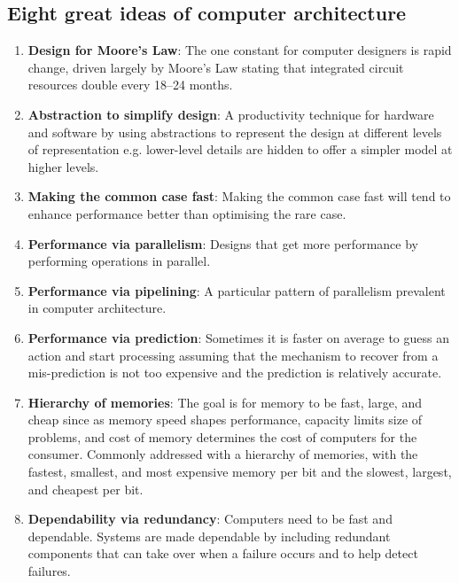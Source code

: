 \documentclass[10pt,a4paper]{article}
\begin{document}
\subsection{Eight great ideas of computer architecture}

\begin{enumerate}
    \item \textbf{Design for Moore's Law}: The one constant for computer designers is rapid change, driven largely by Moore’s Law stating that integrated circuit resources double every 18–24 months.
    \item \textbf{Abstraction to simplify design}: A productivity technique for hardware and
    software by using abstractions to represent the design at different levels of representation
    e.g. lower-level details are hidden to offer a simpler model at higher levels.
    \item \textbf{Making the common case fast}: Making the common case fast will tend to enhance
    performance better than optimising the rare case. 
    \item \textbf{Performance via parallelism}: Designs that get more performance by performing operations in parallel.
    \item \textbf{Performance via pipelining}: A particular pattern of parallelism prevalent in
    computer architecture. 
    \item \textbf{Performance via prediction}: Sometimes it is faster on average to guess an action
    and start processing assuming that the mechanism to recover from a mis-prediction is not too
    expensive and the prediction is relatively accurate.
    \item \textbf{Hierarchy of memories}: The goal is for memory to be fast, large, and cheap since
    as memory speed shapes performance, capacity limits size of problems, and cost of memory
    determines the cost of computers for the consumer. Commonly addressed with a hierarchy of memories, with 
    the fastest, smallest, and most expensive memory per bit and the slowest, largest, and cheapest
    per bit.
    \item \textbf{Dependability via redundancy}: Computers need to be fast and dependable. Systems
    are made dependable by including redundant components that can take over when a failure occurs and to help detect failures.
\end{enumerate}
\end{document}
